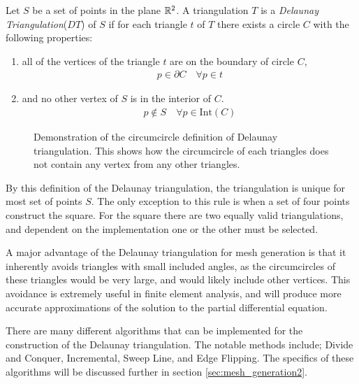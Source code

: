 \documentclass[../fem.tex]{subfile}
\begin{document}
\begin{definition}
   Let $S$ be a set of points in the plane $\mathbb{R}^2$. A triangulation $T$ is a
   \textit{Delaunay Triangulation}($DT$) of $S$ if for each triangle $t$ of $T$
   there exists a circle $C$ with the following properties:
   \begin{enumerate}
     \item all of the vertices of the triangle $t$ are on the boundary of
       circle $C$,
       \begin{align*}
          p\in\partial C\quad\forall p\in t
       \end{align*}
     \item and no other vertex of $S$ is in the interior of $C$.
       \begin{align*}
         p\notin S\quad\forall p\in\text{Int}(C)
       \end{align*}
   \end{enumerate}
\end{definition}

\begin{figure}[htpb]
  \centering
  
  \caption{Demonstration of the circumcircle definition of Delaunay
  triangulation. This shows how the circumcircle of each triangles does not
contain any vertex from any other triangles.}
  \label{fig:}
\end{figure}

By this definition of the Delaunay triangulation, the triangulation is unique
for most set of points $S$. The only exception to this rule is when a set of
four points construct the square. For the square there are two equally valid
triangulations, and dependent on the implementation one or the other must be
selected.

A major advantage of the Delaunay triangulation for mesh generation is that it
inherently avoids triangles with small included angles, as the circumcircles of
these triangles would be very large, and would likely include other vertices.
This avoidance is extremely useful in finite element analysis, and will produce
more accurate approximations of the solution to the partial differential
equation.

There are many different algorithms that can be implemented for the
construction of the Delaunay triangulation. The notable methods include; Divide
and Conquer, Incremental, Sweep Line, and Edge Flipping. The specifics of these
algorithms will be discussed further in section \ref{sec:mesh_generation2}.
\end{document}
